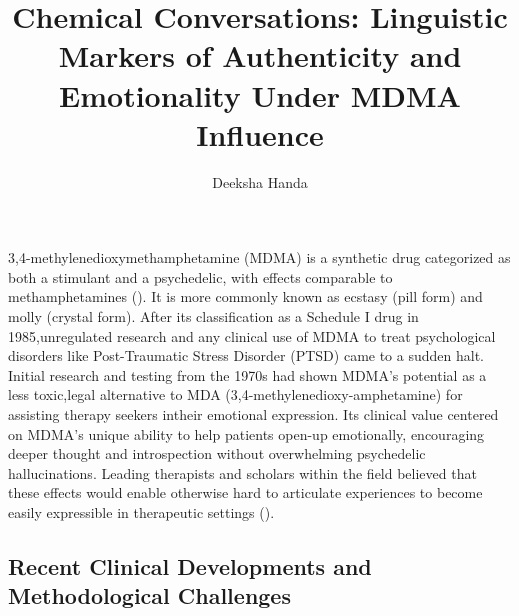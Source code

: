 \documentclass[
  man,
  longtable,
  nolmodern,
  notxfonts,
  notimes,
  colorlinks=true,linkcolor=blue,citecolor=blue,urlcolor=blue]{apa7}
\title{Chemical Conversations: Linguistic Markers of Authenticity and
Emotionality Under MDMA Influence}
\author{Deeksha Handa}
\affiliation{
{Social Sciences Department, University of Chicago}}
\begin{document}
\maketitle


\setcounter{secnumdepth}{-\maxdimen} %

\setlength\LTleft{0pt}


3,4-methylenedioxymethamphetamine (MDMA) is a synthetic drug categorized
as both a stimulant and a psychedelic, with effects comparable to
methamphetamines (). It is more commonly known as ecstasy
(pill form) and molly (crystal form). After its classification as a
Schedule I drug in 1985,unregulated research and any clinical use of
MDMA to treat psychological disorders like Post-Traumatic Stress
Disorder (PTSD) came to a sudden halt. Initial research and testing from
the 1970s had shown MDMA's potential as a less toxic,legal alternative
to MDA (3,4-methylenedioxy-amphetamine) for assisting therapy seekers
intheir emotional expression. Its clinical value centered on MDMA's
unique ability to help patients open-up emotionally, encouraging deeper
thought and introspection without overwhelming psychedelic
hallucinations. Leading therapists and scholars within the field
believed that these effects would enable otherwise hard to articulate
experiences to become easily expressible in therapeutic settings
().

\subsection{Recent Clinical Developments and Methodological
Challenges}\label{recent-clinical-developments-and-methodological-challenges}
\end{document}
